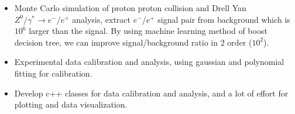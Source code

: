 \documentclass[10pt,a4paper,ragged2e]{mhcv}
\begin{document}

\begin{fullwidth}
\makecvheader
\end{fullwidth}




\iftrue
{}
\begin{itemize}
    \item Monte Carlo simulation of proton proton collision and Drell Yan $Z^0/\gamma^*\rightarrow e^-/e^+$ analysis, extract $e^-/e^+$ signal pair from background which is $10^6$ larger than the signal. By using machine learning method of boost decision tree, we can improve signal/background ratio in 2 order ($10^2$).
    \item Experimental data calibration and analysis, using gaussian and polynomial fitting for calibration.
    \item Develop c++ classes for data calibration and analysis, and a lot of effort for plotting and data visualization. 
\end{itemize}
\end{document}
